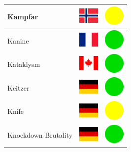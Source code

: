 \documentclass[12pt, a4paper, twoside]{report}
\begin{document}
\begin{center}
\begin{longtable}{|p{5cm}|p{2cm}|p{2cm}|}
Kampfar & \includegraphics[width=1cm]{4x3/no} & \includegraphics[width=1cm]{likes/m} \\ \hline
Kanine & \includegraphics[width=1cm]{4x3/fr} & \includegraphics[width=1cm]{likes/y} \\ \hline
Kataklysm & \includegraphics[width=1cm]{4x3/ca} & \includegraphics[width=1cm]{likes/y} \\ \hline
Keitzer & \includegraphics[width=1cm]{4x3/de} & \includegraphics[width=1cm]{likes/y} \\ \hline
Knife & \includegraphics[width=1cm]{4x3/de} & \includegraphics[width=1cm]{likes/m} \\ \hline
Knockdown Brutality & \includegraphics[width=1cm]{4x3/de} & \includegraphics[width=1cm]{likes/y} \\ \hline

\end{longtable}
\end{center}
\end{document}
